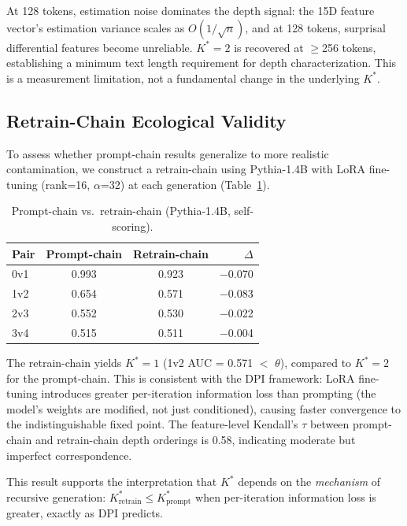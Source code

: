 \documentclass[11pt,a4paper]{article}
\newcommand{\kstar}{K^{*}}
\begin{document}
At 128 tokens, estimation noise dominates the depth signal: the 15D feature vector's estimation variance scales as $O(1/\sqrt{n})$, and at 128 tokens, surprisal differential features become unreliable.
$\kstar = 2$ is recovered at $\geq$256 tokens, establishing a minimum text length requirement for depth characterization.
This is a measurement limitation, not a fundamental change in the underlying $\kstar$.

\subsection{Retrain-Chain Ecological Validity}
\label{sec:retrain}

To assess whether prompt-chain results generalize to more realistic contamination, we construct a retrain-chain using Pythia-1.4B with LoRA fine-tuning (rank=16, $\alpha$=32) at each generation (Table~\ref{tab:retrain}).

\begin{table}[t]
\centering
\small
\caption{Prompt-chain vs.\ retrain-chain (Pythia-1.4B, self-scoring).}
\label{tab:retrain}
\begin{tabular}{lccr}
\toprule
Pair & Prompt-chain & Retrain-chain & $\Delta$ \\
\midrule
0v1 & 0.993 & 0.923 & $-$0.070 \\
1v2 & 0.654 & 0.571 & $-$0.083 \\
2v3 & 0.552 & 0.530 & $-$0.022 \\
3v4 & 0.515 & 0.511 & $-$0.004 \\
\bottomrule
\end{tabular}
\end{table}

The retrain-chain yields $\kstar = 1$ (1v2 AUC = 0.571 $<$ $\theta$), compared to $\kstar = 2$ for the prompt-chain.
This is consistent with the DPI framework: LoRA fine-tuning introduces greater per-iteration information loss than prompting (the model's weights are modified, not just conditioned), causing faster convergence to the indistinguishable fixed point.
The feature-level Kendall's $\tau$ between prompt-chain and retrain-chain depth orderings is 0.58, indicating moderate but imperfect correspondence.

This result supports the interpretation that $\kstar$ depends on the \emph{mechanism} of recursive generation: $\kstar_{\text{retrain}} \leq \kstar_{\text{prompt}}$ when per-iteration information loss is greater, exactly as DPI predicts.
\end{document}
